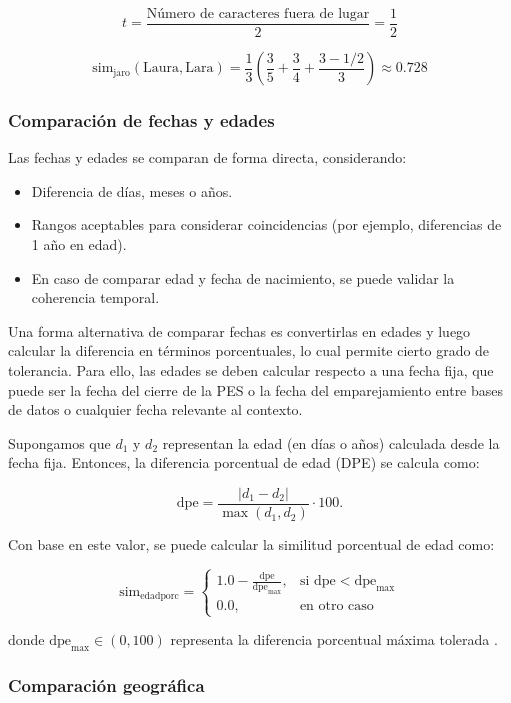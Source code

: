 \documentclass[
  12pt,
]{book}
\providecommand{\tightlist}{%
  \setlength{\itemsep}{0pt}\setlength{\parskip}{0pt}}
\begin{document}
\[t = \frac{\text{Número de caracteres fuera de lugar}}{2} = \frac{1}{2}\]

\[\text{sim}_{\text{jaro}}(\text{Laura}, \text{Lara}) = \frac{1}{3}\left( \frac{3}{5} + \frac{3}{4} + \frac{3 - 1/2}{3}\right) \approx 0.728\]

\subsubsection{Comparación de fechas y edades}\label{comparaciuxf3n-de-fechas-y-edades}

Las fechas y edades se comparan de forma directa, considerando:

\begin{itemize}
\tightlist
\item
  Diferencia de días, meses o años.
\item
  Rangos aceptables para considerar coincidencias (por ejemplo, diferencias de 1 año en edad).
\item
  En caso de comparar edad y fecha de nacimiento, se puede validar la coherencia temporal.
\end{itemize}

Una forma alternativa de comparar fechas es convertirlas en edades y luego calcular la diferencia en términos porcentuales, lo cual permite cierto grado de tolerancia. Para ello, las edades se deben calcular respecto a una fecha fija, que puede ser la fecha del cierre de la PES o la fecha del emparejamiento entre bases de datos o cualquier fecha relevante al contexto.

Supongamos que \(d_1\) y \(d_2\) representan la edad (en días o años) calculada desde la fecha fija. Entonces, la diferencia porcentual de edad (DPE) se calcula como:

\[\text{dpe} = \frac{|d_1 - d_2|}{\max(d_1, d_2)} \cdot 100.\]

Con base en este valor, se puede calcular la similitud porcentual de edad como:

\[
\text{sim}_{\text{edadporc}} =
\begin{cases}
1.0 - \frac{\text{dpe}}{\text{dpe}_{\max}}, & \text{si } \text{dpe} < \text{dpe}_{\max} \\
0.0, & \text{en otro caso}
\end{cases}
\]

donde \(\text{dpe}_{\max} \in (0, 100)\) representa la diferencia porcentual máxima tolerada \citep{christen2012data}.

\subsubsection{Comparación geográfica}\label{comparaciuxf3n-geogruxe1fica}
\end{document}
